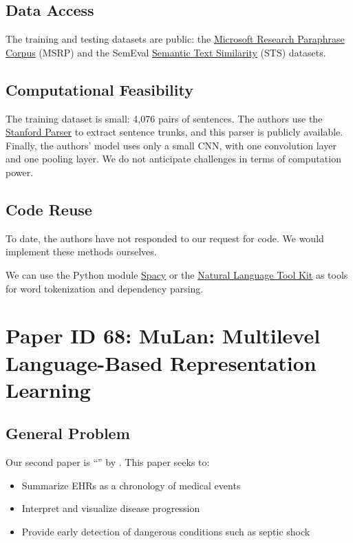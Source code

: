 \documentclass[11pt,a4paper]{article}
\begin{document}
\subsection{Data Access}
The training and testing datasets are public: the \href{https://www.microsoft.com/en-us/download/details.aspx?id=52398}{Microsoft Research Paraphrase Corpus} (MSRP) and the SemEval \href{https://github.com/brmson/dataset-sts/tree/master/data/sts/semeval-sts}{Semantic Text Similarity} (STS) datasets.

\subsection{Computational Feasibility}
The training dataset is small: 4,076 pairs of sentences. The authors use the \href{https://nlp.stanford.edu/software/lex-parser.shtml}{Stanford Parser} to extract sentence trunks, and this parser is publicly available. Finally, the authors' model uses only a small CNN, with one convolution layer and one pooling layer. We do not anticipate challenges in terms of computation power. 

\subsection{Code Reuse}
To date, the authors have not responded to our request for code. We would implement these methods ourselves. 

We can use the Python module \href{https://spacy.io/}{Spacy} or the \href{https://www.nltk.org/}{Natural Language Tool Kit} as tools for word tokenization and dependency parsing. 

\section{Paper ID 68: MuLan: Multilevel Language-Based Representation Learning}
\subsection{General Problem}
Our second paper is ``'' by \citeauthor*{sohn_2020}. This paper seeks to:
\begin{itemize}
  \item Summarize EHRs as a chronology of medical events
  \item Interpret and visualize disease progression
  \item Provide early detection of dangerous conditions such as septic shock
\end{itemize}
\end{document}
